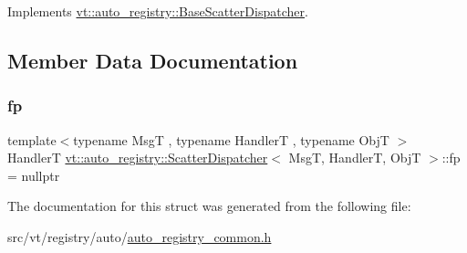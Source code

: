 Implements \hyperlink{structvt_1_1auto__registry_1_1_base_scatter_dispatcher_af9efaf266a3a809bfeaba5269f1583b2}{vt\+::auto\+\_\+registry\+::\+Base\+Scatter\+Dispatcher}.



\subsection{Member Data Documentation}
\mbox{\label{structvt_1_1auto__registry_1_1_scatter_dispatcher_ab46d5400a04ca6282b2db43de7d0ca31}} 
\subsubsection{\texorpdfstring{fp}{fp}}
{\footnotesize\ttfamily template$<$typename MsgT , typename HandlerT , typename ObjT $>$ \\
HandlerT \hyperlink{structvt_1_1auto__registry_1_1_scatter_dispatcher}{vt\+::auto\+\_\+registry\+::\+Scatter\+Dispatcher}$<$ MsgT, HandlerT, ObjT $>$\+::fp = nullptr\hspace{0.3cm}{\ttfamily [private]}}



The documentation for this struct was generated from the following file\+:\begin{DoxyCompactItemize}
\item 
src/vt/registry/auto/\hyperlink{auto__registry__common_8h}{auto\+\_\+registry\+\_\+common.\+h}\end{DoxyCompactItemize}
